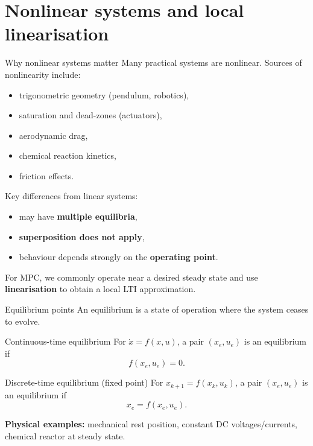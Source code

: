 \documentclass[aspectratio=169,10pt]{beamer}
\begin{document}
\section{Nonlinear systems and local linearisation}

\begin{frame}{Why nonlinear systems matter}
Many practical systems are nonlinear.
Sources of nonlinearity include:
\begin{itemize}
  \item trigonometric geometry (pendulum, robotics),
  \item saturation and dead-zones (actuators),
  \item aerodynamic drag,
  \item chemical reaction kinetics,
  \item friction effects.
\end{itemize}

Key differences from linear systems:
\begin{itemize}
  \item may have \textbf{multiple equilibria},
  \item \textbf{superposition does not apply},
  \item behaviour depends strongly on the \textbf{operating point}.
\end{itemize}

For MPC, we commonly operate near a desired steady state and use
\textbf{linearisation} to obtain a local LTI approximation.
\end{frame}

\begin{frame}{Equilibrium points}
An equilibrium is a state of operation where the system ceases to evolve.

\begin{defnbox}{Continuous-time equilibrium}
For $\dot{x}=f(x,u)$, a pair $(x_e,u_e)$ is an equilibrium if
\[
f(x_e,u_e)=0.
\]
\end{defnbox}

\begin{defnbox}{Discrete-time equilibrium (fixed point)}
For $x_{k+1}=f(x_k,u_k)$, a pair $(x_e,u_e)$ is an equilibrium if
\[
x_e = f(x_e,u_e).
\]
\end{defnbox}

\textbf{Physical examples:}
mechanical rest position, constant DC voltages/currents,
chemical reactor at steady state.
\end{frame}
\end{document}
